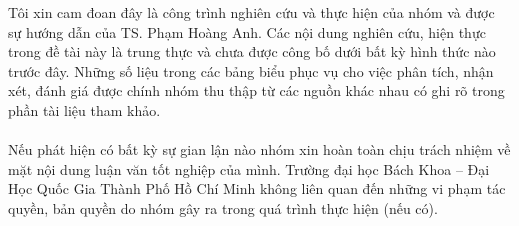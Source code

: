 
\begin{declaration}

Tôi xin cam đoan đây là công trình nghiên cứu và thực hiện của nhóm và được sự hướng dẫn của TS. Phạm Hoàng Anh. Các nội dung nghiên cứu, hiện thực trong đề tài này là trung thực và chưa được công bố dưới bất kỳ hình thức nào trước đây. Những số liệu trong các bảng biểu phục vụ cho việc phân tích, nhận xét, đánh giá được chính nhóm thu thập từ các nguồn khác nhau có ghi rõ trong phần tài liệu tham khảo.\\\\
Nếu phát hiện có bất kỳ sự gian lận nào nhóm xin hoàn toàn chịu trách nhiệm về mặt nội dung luận văn tốt nghiệp của mình. Trường đại học Bách Khoa – Đại Học Quốc Gia Thành Phố Hồ Chí Minh không liên quan đến những vi phạm tác quyền, bản quyền do nhóm gây ra trong quá trình thực hiện (nếu có).

\end{declaration}

